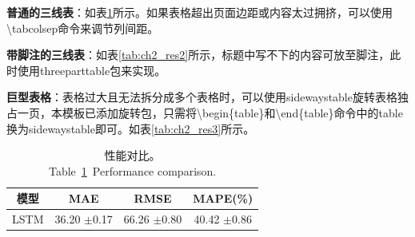 \textbf{普通的三线表}：如表\ref{tab:ch2_res1}所示。如果表格超出页面边距或内容太过拥挤，可以使用\textbackslash tabcolsep命令来调节列间距。

\textbf{带脚注的三线表}：如表\ref{tab:ch2_res2}所示，标题中写不下的内容可放至脚注，此时使用threeparttable包来实现。

\textbf{巨型表格}：表格过大且无法拆分成多个表格时，可以使用sidewaystable旋转表格独占一页，本模板已添加旋转包，只需将\textbackslash begin\{table\}和\textbackslash end\{table\}命令中的table换为sidewaystable即可。如表\ref{tab:ch2_res3}所示。

%		

\begin{table}[!htb]
	\centering
	\small %
	\setlength\tabcolsep{10pt} %
	\caption{性能对比。\\Table~\ref{tab:ch2_res1}~Performance comparison. }
	\begin{tabular}{c|ccc}
		\toprule
		模型 & MAE & RMSE & MAPE(\%)  \\
		\midrule
		LSTM & 36.20 $\pm$0.17 & 66.26 $\pm$0.80 & 40.42 $\pm$0.86 \\
		\bottomrule
	\end{tabular}
	\label{tab:ch2_res1}
\end{table}

